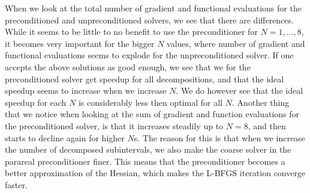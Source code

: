 When we look at the total number of gradient and functional evaluations for the preconditioned and unpreconditioned solvers, we see that there are differences. While it seems to be little to no benefit to use the preconditioner for $N=1,...,8$, it becomes very important for the bigger $N$ values, where number of gradient and functional evaluations seems to explode for the unpreconditioned solver. If one accepts the above solutions as good enough, we see that we for the preconditioned solver get speedup for all decompositions, and that the ideal speedup seems to increase when we increase $N$. We do however see that the ideal speedup for each $N$ is considerably less then optimal for all $N$. Another thing that we notice when looking at the sum of gradient and function evaluations for the preconditioned solver, is that it increases steadily up to $N=8$, and then starts to decline again for higher $N$s. The reason for this is that when we increase the number of decomposed subintervals, we also make the coarse solver in the parareal preconditioner finer. This means that the preconditioner becomes a better approximation of the Hessian, which makes the L-BFGS iteration converge faster.
